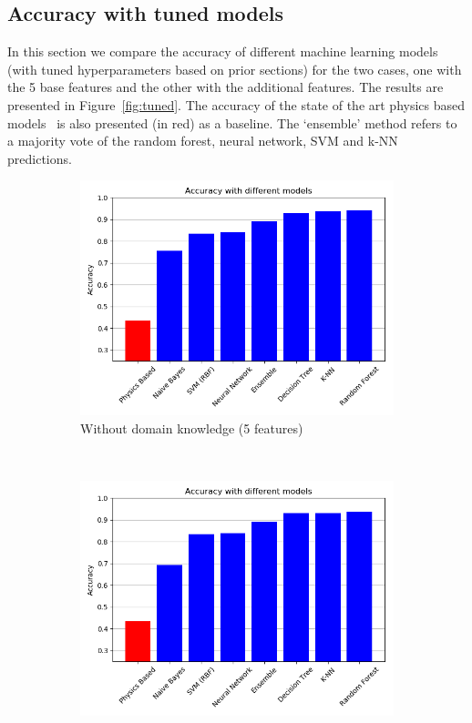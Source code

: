 \documentclass{article}
\begin{document}
\subsection{Accuracy with tuned models}
In this section we compare the accuracy of different machine learning models (with tuned hyperparameters based on prior sections) for the two cases,  one with the 5 base features and the other with the additional features. The results are presented in Figure~\ref{fig:tuned}. The accuracy of the state of the art physics based models~\cite{agarwal2019computational} is also presented (in red) as a baseline. The `ensemble' method refers to a majority vote of the random forest, neural network, SVM and k-NN predictions. 

\begin{figure}[h!]
    \centering
    \begin{subfigure}[b]{0.45\textwidth}
        \includegraphics[width=\textwidth]{../figures/wo_domain_knowledge/accuracy_compilation.png}
        \caption{Without domain knowledge (5  features)}
        \label{fig:gull}
    \end{subfigure}
    ~ %
    \begin{subfigure}[b]{0.45\textwidth}
        \includegraphics[width=\textwidth]{../figures/w_domain_knowledge/accuracy_compilation.png}

\end{subfigure}
\end{figure}
\end{document}
